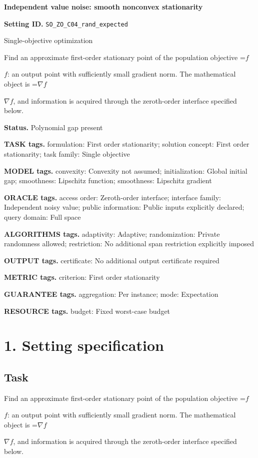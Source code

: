 \documentclass[10pt,a4paper]{article}
\newcommand{\AtlasMath}[1]{\par\begingroup\centering\setbox0=\hbox{$\displaystyle #1$}\ifdim\wd0>1.4\linewidth\typeout{ATLAS WIDE FORMULA: \the\wd0}\fi\ifdim\wd0>\linewidth\resizebox{\linewidth}{!}{\box0}\else\box0\fi\par\endgroup}
\newcommand{\AtlasInlineMath}[1]{\begingroup\setbox0=\hbox{$#1$}\ifdim\wd0>.4\linewidth\endgroup\AtlasMath{#1}\else\endgroup$#1$\fi}
\begin{document}
\raggedright

{\LARGE\bfseries\sffamily\color{AtlasNavy} Independent value noise: smooth nonconvex stationarity\par}\vspace{5pt}
\textbf{Setting ID.} \texttt{SO\_\allowbreak{}ZO\_\allowbreak{}C04\_\allowbreak{}rand\_\allowbreak{}expected}

Single-objective optimization

Find an approximate first-order stationary point of the population objective \AtlasInlineMath{f}: an output point with sufficiently small gradient norm. The mathematical object is \AtlasInlineMath{\nabla f}, and information is acquired through the zeroth-order interface specified below.

\textbf{Status.} Polynomial gap present

\textbf{TASK tags.} formulation: First order stationarity; solution concept: First order stationarity; task family: Single objective

\textbf{MODEL tags.} convexity: Convexity not assumed; initialization: Global initial gap; smoothness: Lipschitz function; smoothness: Lipschitz gradient

\textbf{ORACLE tags.} access order: Zeroth-order interface; interface family: Independent noisy value; public information: Public inputs explicitly declared; query domain: Full space

\textbf{ALGORITHMS tags.} adaptivity: Adaptive; randomization: Private randomness allowed; restriction: No additional span restriction explicitly imposed

\textbf{OUTPUT tags.} certificate: No additional output certificate required

\textbf{METRIC tags.} criterion: First order stationarity

\textbf{GUARANTEE tags.} aggregation: Per instance; mode: Expectation

\textbf{RESOURCE tags.} budget: Fixed worst-case budget

\section{1. Setting specification}
\subsection{Task}
Find an approximate first-order stationary point of the population objective \AtlasInlineMath{f}: an output point with sufficiently small gradient norm. The mathematical object is \AtlasInlineMath{\nabla f}, and information is acquired through the zeroth-order interface specified below.
\end{document}
